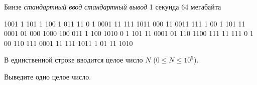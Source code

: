 \begin{problem}%
{Бинзе}%
{\textsl{стандартный ввод}}%
{\textsl{стандартный вывод}}%
{1 секунда}%
{64 мегабайта}{}

1001 1 101 1 100 1 011 11 0 1 0001 11 111 1011 000 11 0011 111 1 00 1 101 11 0001 01 000 1000 100 011 1 100 1010 0 1 101 11 0001 01 110 1100 111 11 111 0 1 00 110 111 0001 11 111 1011 1 01 11 1010

\InputFile

В единственной строке вводится целое число $N$ ($0 \le N \le 10^5$).

\OutputFile

Выведите одно целое число.

\Examples

\begin{example}
%
%
\end{example}
\end{problem}
